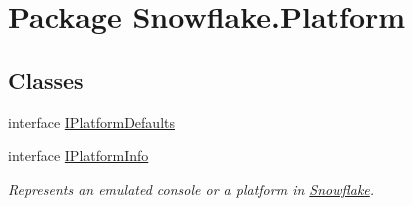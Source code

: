 \hypertarget{namespace_snowflake_1_1_platform}{}\section{Package Snowflake.\+Platform}
\label{namespace_snowflake_1_1_platform}
\subsection*{Classes}
\begin{DoxyCompactItemize}
\item 
interface \hyperlink{interface_snowflake_1_1_platform_1_1_i_platform_defaults}{I\+Platform\+Defaults}
\item 
interface \hyperlink{interface_snowflake_1_1_platform_1_1_i_platform_info}{I\+Platform\+Info}
\begin{DoxyCompactList}\small\item\em Represents an emulated console or a platform in \hyperlink{namespace_snowflake}{Snowflake}. \end{DoxyCompactList}\end{DoxyCompactItemize}
